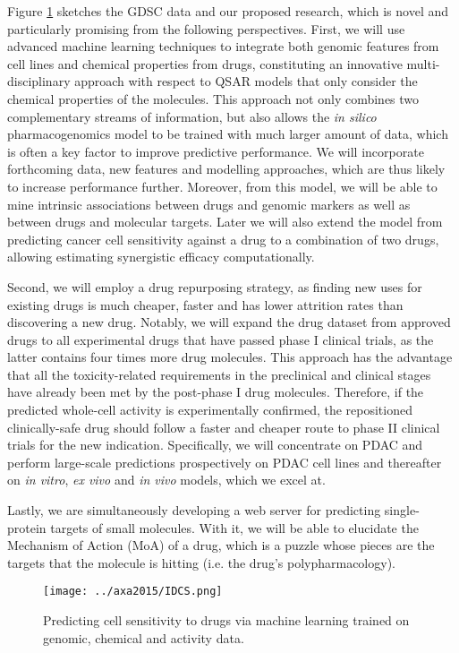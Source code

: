 \documentclass[a4paper,11pt]{article}
\begin{document}
Figure \ref{IDCS} sketches the GDSC data and our proposed research, which is novel and particularly promising from the following perspectives. First, we will use advanced machine learning techniques to integrate both genomic features from cell lines and chemical properties from drugs, constituting an innovative multi-disciplinary approach with respect to QSAR models that only consider the chemical properties of the molecules. This approach not only combines two complementary streams of information, but also allows the \textit{in silico} pharmacogenomics model to be trained with much larger amount of data, which is often a key factor to improve predictive performance. We will incorporate forthcoming data, new features and modelling approaches, which are thus likely to increase performance further. Moreover, from this model, we will be able to mine intrinsic associations between drugs and genomic markers as well as between drugs and molecular targets. Later we will also extend the model from predicting cancer cell sensitivity against a drug to a combination of two drugs, allowing estimating synergistic efficacy computationally.

Second, we will employ a drug repurposing strategy, as finding new uses for existing drugs is much cheaper, faster and has lower attrition rates than discovering a new drug. Notably, we will expand the drug dataset from approved drugs to all experimental drugs that have passed phase I clinical trials, as the latter contains four times more drug molecules. This approach has the advantage that all the toxicity-related requirements in the preclinical and clinical stages have already been met by the post-phase I drug molecules. Therefore, if the predicted whole-cell activity is experimentally confirmed, the repositioned clinically-safe drug should follow a faster and cheaper route to phase II clinical trials for the new indication. Specifically, we will concentrate on PDAC and perform large-scale predictions prospectively on PDAC cell lines and thereafter on \textit{in vitro}, \textit{ex vivo} and \textit{in vivo} models, which we excel at.

Lastly, we are simultaneously developing a web server for predicting single-protein targets of small molecules. With it, we will be able to elucidate the Mechanism of Action (MoA) of a drug, which is a puzzle whose pieces are the targets that the molecule is hitting (i.e. the drug’s polypharmacology).

\begin{figure}[t!]
\texttt{[image: ../axa2015/IDCS.png]}
\caption{Predicting cell sensitivity to drugs via machine learning trained on genomic, chemical and activity data.}
\label{IDCS}
\end{figure}

\linespread{0.5}


\end{document}
